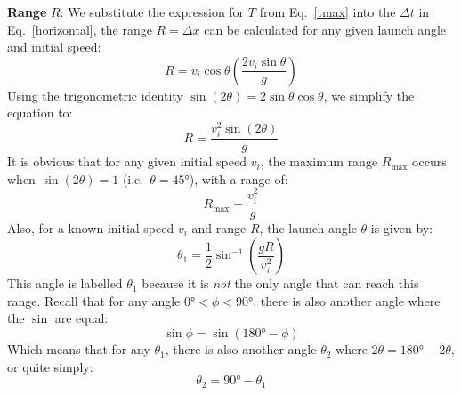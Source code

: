 \textbf{Range} $R$: We substitute the expression for $T$ from
Eq.~\ref{tmax} into the $\Delta t$ in Eq.~\ref{horizontal}, the range
$R=\Delta x$ can be calculated for any given launch angle and initial speed:
\begin{equation*}
  R =v_i\cos\theta\left(\frac{2v_i\sin\theta}g\right)
\end{equation*}
Using the trigonometric identity $\sin(2\theta)=2\sin\theta\cos\theta$, we
simplify the equation to:
\begin{equation}
  \boxed{R=\frac{v_i^2\sin(2\theta)}g}
\end{equation}
It is obvious that for any given initial speed $v_i$, the maximum range
$R_\text{max}$ occurs when $\sin(2\theta)=1$ (i.e.\ $\theta=\ang{45}$), with a
range of:
\begin{equation}
  \boxed{R_\text{max}=\frac{v_i^2}g}
\end{equation}
Also, for a known initial speed $v_i$ and range $R$, the launch angle $\theta$
is given by:
\begin{equation}
  \boxed{
    \theta_1=\frac12\sin^{-1}\left(\frac{gR}{v_i^2}\right)
  }
\end{equation}
This angle is labelled $\theta_1$ because it is \emph{not} the only angle that
can reach this range. Recall that for any angle $\ang{0}<\phi<\ang{90}$, there
is also another angle where the $\sin$ are equal:
\begin{displaymath}
  \sin\phi=\sin(\ang{180}-\phi)
\end{displaymath}
Which means that for any $\theta_1$, there is also another angle $\theta_2$
where $2\theta=\ang{180}-2\theta$, or quite simply:
\begin{equation}
  \boxed{\theta_2=\ang{90}-\theta_1}
\end{equation}
%
